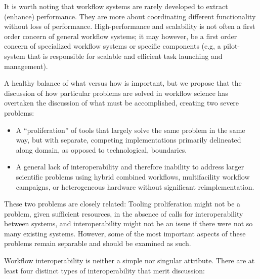 It is worth noting that workflow systems are rarely developed to extract
(enhance) performance. They are more about coordinating different
functionality without loss of performance. High-performance and scalability is
not often a first order concern of general workflow systems; it may however,
be a first order concern of specialized workflow systems or specific
components (e.g, a pilot-system that is responsible for scalable and efficient task launching and management).

A healthy balance of what versus how is
important, but we propose that the discussion of how particular problems are
solved in workflow science has overtaken the discussion of what must be
accomplished, creating two severe problems: \begin{itemize} \item A
``proliferation'' of tools that largely solve the same problem in the same way,
but with separate, competing implementations primarily delineated along domain,
as opposed to technological, boundaries.  \item A general lack of
interoperability and therefore inability to address larger scientific problems
using hybrid combined workflows, multifacility workflow campaigns, or
heterogeneous hardware without significant reimplementation.  \end{itemize}

These two problems are closely related: Tooling proliferation might not be a
problem, given sufficient resources, in the absence of calls for
interoperability between systems, and interoperability might not be an issue if
there were not so many existing systems. However, some of the most important
aspects of these problems remain separable and should be examined as such.

Workflow interoperability is neither a simple nor singular attribute. There
are at least four distinct types of interoperability that merit discussion:

